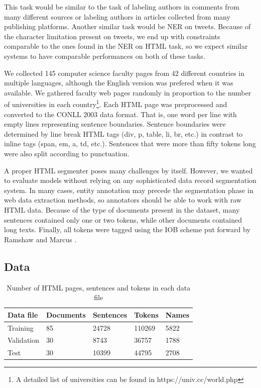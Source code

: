 \documentclass[sigconf]{acmart}
\begin{document}
This task would be similar to the task of labeling authors in comments
from many different sources or labeling authors in articles collected from many
publishing platforms. Another similar task would be NER on tweets. Because of the character
limitation present on tweets, we end up with constraints comparable to the ones
found in the NER on HTML task, so we expect similar systems to have comparable performances
on both of these tasks.

We collected 145 computer science faculty pages from 42 different countries in
multiple languages, although the English version was prefered when it was available.
We gathered faculty web pages randomly in proportion to
the number of universities in each country\footnote{A detailed list of universities can
be found in https://univ.cc/world.php}. Each HTML page was preprocessed and converted
to the CONLL 2003 data format. That is, one word per line with empty lines representing
sentence boundaries. Sentence boundaries were determined by line break HTML tags
(div, p, table, li, br, etc.) in contrast to inline tags (span, em, a, td, etc.). 
Sentences that were more than fifty tokens long were also split according to punctuation.

A proper HTML segmenter poses many challenges by itself.
However, we wanted to evaluate models without relying on any sophisticated data record
segmentation system. In many cases, entity annotation may precede the segmentation
phase in web data extraction methods, so annotators should be able to work with
raw HTML data. Because of the type of documents present in the dataset, many sentences 
contained only one or two tokens, while other documents contained long texts.
Finally, all tokens were tagged using the IOB scheme put forward by
Ramshaw and Marcus \cite{Ramshaw1999}. 

\subsection{Data}

\begin{table}[h]
  \small
  \begin{center}
    \begin{tabular}{ lllll }
      \toprule
      Data file & Documents & Sentences & Tokens & Names \\
      \midrule
      Training    & 85 & 24728 & 110269 & 5822 \\  
      Validation  & 30 & 8743  & 36757  & 1788 \\
      Test        & 30 & 10399 & 44795  & 2708 \\
      \bottomrule
    \end{tabular}
  \end{center}
  \caption{Number of HTML pages, sentences and tokens in each data file}
  \label{tab:dataset}
\end{table}
\end{document}
